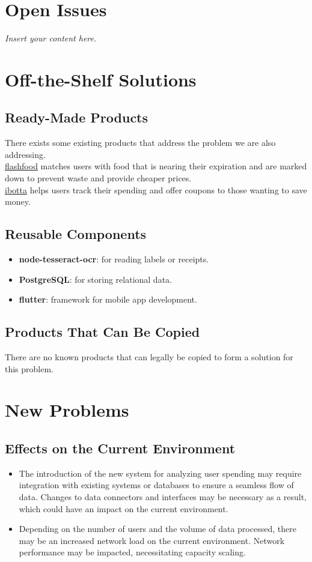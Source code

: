 \documentclass[12pt]{article}
\newcommand{\lips}{\textit{Insert your content here.}}
\begin{document}
\section{Open Issues}
\lips

\section{Off-the-Shelf Solutions}
\subsection{Ready-Made Products}
There exists some existing products that address the problem we are also addressing. \\

\href{https://www.flashfood.com/}{flashfood} matches users with food that is nearing their expiration and are marked down to prevent waste and provide cheaper prices.\\

\href{https://home.ibotta.com/}{ibotta} helps users track their spending and offer coupons to those wanting to save money.\\

\subsection{Reusable Components}
\begin{itemize}
  \item \textbf{node-tesseract-ocr}: for reading labels or receipts.
  \item \textbf{PostgreSQL}: for storing relational data.
  \item \textbf{flutter}: framework for mobile app development.
\end{itemize}

\subsection{Products That Can Be Copied}
There are no known products that can legally be copied to form a solution for this problem.

\section{New Problems}
\subsection{Effects on the Current Environment}
\begin{itemize}
    \item The introduction of the new system for analyzing user spending may require integration with existing systems or databases to ensure a seamless flow of data. Changes to data connectors and interfaces may be necessary as a result, which could have an impact on the current environment.
    \item Depending on the number of users and the volume of data processed, there may be an increased network load on the current environment. Network performance may be impacted, necessitating capacity scaling.
\end{itemize}
\end{document}
